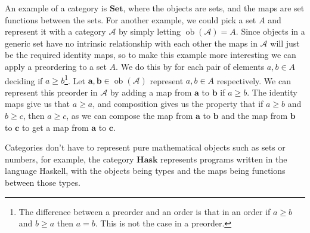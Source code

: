 \documentclass[logo,bsc,singlespacing,parskip]{infthesis}
\theoremstyle{definition}
\newcommand{\cat}[1]{\mathscr{#1}}
\newcommand{\ob}[1]{\obj(\mathscr{#1})}
\DeclareMathOperator{\obj}{ob}
\begin{document}
An example of a category is $\mathbf{Set}$, where the objects are sets, and the maps are set functions between the sets. For another example, we could pick a set $A$ and represent it with a category $\cat{A}$ by simply letting $\ob{A} = A$. Since objects in a generic set have no intrinsic relationship with each other the maps in $\cat{A}$ will just be the required identity maps, so to make this example more interesting we can apply a preordering to a set $A$. We do this by for each pair of elements $a,b \in A$ deciding if $a \ge b$\footnote{The difference between a preorder and an order is that in an order if $a \ge b$ and $b \ge a$ then $a = b$. This is not the case in a preorder.}. Let $\mathbf{a}, \mathbf{b} \in \ob{A}$ represent $a,b \in A$ respectively. We can represent this preorder in $\cat A$ by adding a map from $\mathbf{a}$ to $\mathbf{b}$ if $a \ge b$. The identity maps give us that $a \ge a$, and composition gives us the property that if $a \ge b$ and $b \ge c$, then $a \ge c$, as we can compose the map from $\mathbf{a}$ to $\mathbf{b}$ and the map from $\mathbf{b}$ to $\mathbf{c}$ to get a map from $\mathbf{a}$ to $\mathbf{c}$. 

Categories don't have to represent pure mathematical objects such as sets or numbers, for example, the category $\mathbf{Hask}$ \cite{wiki:hask} represents programs written in the language Haskell, with the objects being types and the maps being functions between those types. 

\end{document}
